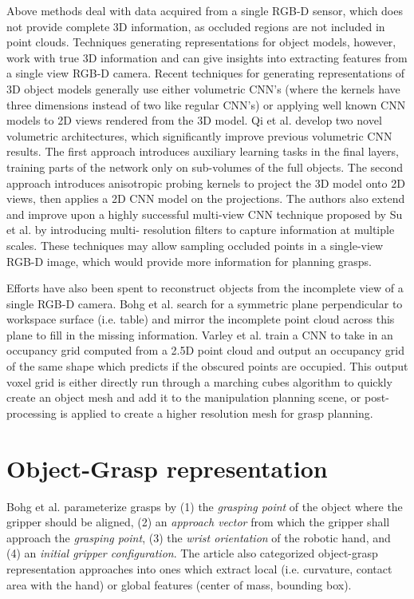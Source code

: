 Above methods deal with data acquired from a single RGB-D sensor, which does not provide complete 3D information, as
occluded regions are not included in point clouds. Techniques generating representations for object models, however,
work with true 3D information and can give insights into extracting features from a single view RGB-D camera. Recent
techniques for generating representations of 3D object models generally use either volumetric CNN's (where the kernels
have three dimensions instead of two like regular CNN's) or applying well known CNN models to 2D views rendered from the
3D model. Qi et al. \cite{Qi2016} develop two novel volumetric architectures, which significantly improve previous
volumetric CNN results. The first approach introduces auxiliary learning tasks in the final layers, training parts of
the network only on sub-volumes of the full objects. The second approach introduces anisotropic probing kernels to
project the 3D model onto 2D views, then applies a 2D CNN model on the projections. The authors also extend and improve
upon a highly successful multi-view CNN technique proposed by Su et al. \cite{Su2015} by introducing multi-
resolution filters to capture information at multiple scales. These techniques may allow sampling occluded points in a
single-view RGB-D image, which would provide more information for planning grasps.

Efforts have also been spent to reconstruct objects from the incomplete view of a single RGB-D camera. Bohg et al.
\cite{Bohg2011MindTheGap} search for a symmetric plane perpendicular to workspace surface (i.e. table) and mirror
the incomplete point cloud across this plane to fill in the missing information. Varley et al. \cite{Varley2017}
train a CNN to take in an occupancy grid computed from a 2.5D point cloud and output an occupancy grid of the same shape
which predicts if the obscured points are occupied. This output voxel grid is either directly run through a marching
cubes algorithm to quickly create an object mesh and add it to the manipulation planning scene, or post-processing
is applied to create a higher resolution mesh for grasp planning.


\section{Object-Grasp representation}
Bohg et al. \cite{Bohg2014} parameterize grasps by (1) the \emph{grasping point} of the object where the gripper
should be aligned, (2) an \emph{approach vector} from which the gripper shall approach the \emph{grasping point},
(3) the \emph{wrist orientation} of the robotic hand, and (4) an \emph{initial gripper configuration}.
The article also categorized object-grasp representation approaches into ones which extract local (i.e. curvature,
contact area with the hand) or global features (center of mass, bounding box).

